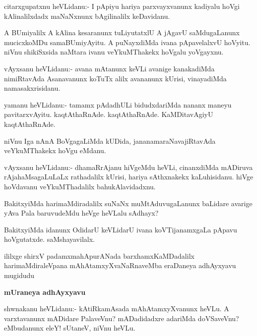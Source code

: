 \begin{mng}
citarxgupatxnu heVLidanu:- I pApiyu hariya parxvayxvanunx kadiyalu hoVgi kAlinalilxdadx maNaNxnunx bAgilinalilx keDavidanu.
\end{mng}

\begin{mng}
A BUmiyalilx A kAlina kesaranunx tuLiyutatxlU A jAgavU saMdugaLanunx mucicxkoMDu samaBUmiyAyitu. A puNayxdiMda ivana pApavelalxvU hoVyitu. niVnu shikiSxsida naMtara ivanu veYkuMThakekx hoVgalu yoVgayxnu.
\end{mng}

\begin{mng}
vAyxsanu heVLidanu:- avana mAtanunx keVLi avanige kanakadiMda nimiRtavAda Asanavanunx koTuTx alilx avananunx kUrisi, vinayadiMda namasakxrisidanu.
\end{mng}

\begin{mng}
yamanu heVLidanu:- tamamx pAdadhULi bidudxdariMda nananx maneyu pavitarxvAyitu. kaqtAthaRnAde. kaqtAthaRnAde. KaMDitavAgiyU kaqtAthaRnAde.
\end{mng}

\begin{mng}
niVnu Iga nAnA BoVgagaLiMda kUDida, jananamaraNavajiRtavAda veYkuMThakekx hoVgu eMdanu.
\end{mng}

\begin{mng}
vAyxsanu heVLidanu:- dhamaRrAjanu hiVgeMdu heVLi, cinanxdiMda mADiruva rAja{ha}MsagaLuLaLx rathadalilx kUrisi, hariya sAthxnakekx kaLuhisidanu. hiVge hoVdavanu veYkuMThadalilx bahukAlavidadxnu.
\end{mng}

\begin{mng}
BakitxyiMda harimaMdiradalilx suNaNx muMtAduvugaLanunx baLidare avarige yAva Pala baruvudeMdu heVge heVLalu sAdhayx?
\end{mng}

\begin{mng}
BakitxyiMda idanunx OdidarU keVLidarU ivana koVTijanamxgaLa pApavu hoVgutatxde. saMshayavilalx.
\end{mng}
ililxge shirxV padamxmahApurANada barxhamxKaMDadalilx harimaMdiraleVpana mAhAtamxyXvaNaRnaveMba eraDaneya adhAyxyavu mugidudu

\begin{center}
\textbf{\Large mUraneya adhAyxyavu}
\end{center}

\begin{mng}
shwnakanu heVLidanu:- kAtiRkamAsada mAhAtamxyXvanunx heVLu. A varxtavanunx mADidare PalaveVnu? mADadidadxre adariMda doVSaveVnu? eMbudanunx eleY! sUtaneV, niVnu heVLu.
\end{mng}

